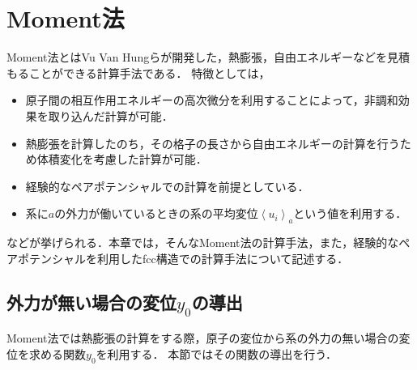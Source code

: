 \chapter{Moment法}
Moment法とはVu Van Hungらが開発した，熱膨張，自由エネルギーなどを見積もることができる計算手法である．
特徴としては，
\begin{itemize}
 \item 原子間の相互作用エネルギーの高次微分を利用することによって，非調和効果を取り込んだ計算が可能．
 \item 熱膨張を計算したのち，その格子の長さから自由エネルギーの計算を行うため体積変化を考慮した計算が可能．
 \item 経験的なペアポテンシャルでの計算を前提としている．
 \item 系に$a$の外力が働いているときの系の平均変位$\left<u_i\right>_a$という値を利用する．
\end{itemize}
などが挙げられる．本章では，そんなMoment法の計算手法，また，経験的なペアポテンシャルを利用したfcc構造での計算手法について記述する．

\section{外力が無い場合の変位$y_0$の導出}
Moment法では熱膨張の計算をする際，原子の変位から系の外力の無い場合の変位を求める関数$y_0$を利用する．
本節ではその関数の導出を行う．

